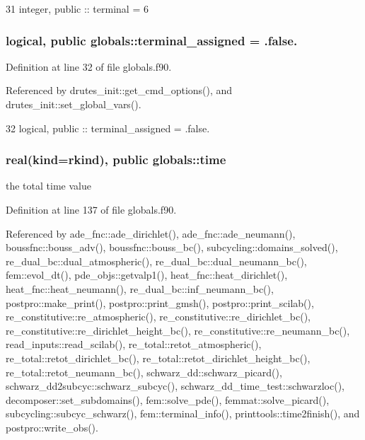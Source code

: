 \begin{DoxyCode}
31   \textcolor{keywordtype}{integer}, \textcolor{keywordtype}{public} :: terminal = 6
\end{DoxyCode}
\subsubsection[{terminal\+\_\+assigned}]{\setlength{\rightskip}{0pt plus 5cm}logical, public globals\+::terminal\+\_\+assigned = .false.}\label{namespaceglobals_a2a52a2212371059ce5658d11600f6ad8}


Definition at line 32 of file globals.\+f90.



Referenced by drutes\+\_\+init\+::get\+\_\+cmd\+\_\+options(), and drutes\+\_\+init\+::set\+\_\+global\+\_\+vars().


\begin{DoxyCode}
32   \textcolor{keywordtype}{logical}, \textcolor{keywordtype}{public} :: terminal_assigned = .false.
\end{DoxyCode}
\subsubsection[{time}]{\setlength{\rightskip}{0pt plus 5cm}real(kind=rkind), public globals\+::time}\label{namespaceglobals_a2df3573bca73071127516bac8a69d587}


the total time value 



Definition at line 137 of file globals.\+f90.



Referenced by ade\+\_\+fnc\+::ade\+\_\+dirichlet(), ade\+\_\+fnc\+::ade\+\_\+neumann(), boussfnc\+::bouss\+\_\+adv(), boussfnc\+::bouss\+\_\+bc(), subcycling\+::domains\+\_\+solved(), re\+\_\+dual\+\_\+bc\+::dual\+\_\+atmospheric(), re\+\_\+dual\+\_\+bc\+::dual\+\_\+neumann\+\_\+bc(), fem\+::evol\+\_\+dt(), pde\+\_\+objs\+::getvalp1(), heat\+\_\+fnc\+::heat\+\_\+dirichlet(), heat\+\_\+fnc\+::heat\+\_\+neumann(), re\+\_\+dual\+\_\+bc\+::inf\+\_\+neumann\+\_\+bc(), postpro\+::make\+\_\+print(), postpro\+::print\+\_\+gmsh(), postpro\+::print\+\_\+scilab(), re\+\_\+constitutive\+::re\+\_\+atmospheric(), re\+\_\+constitutive\+::re\+\_\+dirichlet\+\_\+bc(), re\+\_\+constitutive\+::re\+\_\+dirichlet\+\_\+height\+\_\+bc(), re\+\_\+constitutive\+::re\+\_\+neumann\+\_\+bc(), read\+\_\+inputs\+::read\+\_\+scilab(), re\+\_\+total\+::retot\+\_\+atmospheric(), re\+\_\+total\+::retot\+\_\+dirichlet\+\_\+bc(), re\+\_\+total\+::retot\+\_\+dirichlet\+\_\+height\+\_\+bc(), re\+\_\+total\+::retot\+\_\+neumann\+\_\+bc(), schwarz\+\_\+dd\+::schwarz\+\_\+picard(), schwarz\+\_\+dd2subcyc\+::schwarz\+\_\+subcyc(), schwarz\+\_\+dd\+\_\+time\+\_\+test\+::schwarzloc(), decomposer\+::set\+\_\+subdomains(), fem\+::solve\+\_\+pde(), femmat\+::solve\+\_\+picard(), subcycling\+::subcyc\+\_\+schwarz(), fem\+::terminal\+\_\+info(), printtools\+::time2finish(), and postpro\+::write\+\_\+obs().


